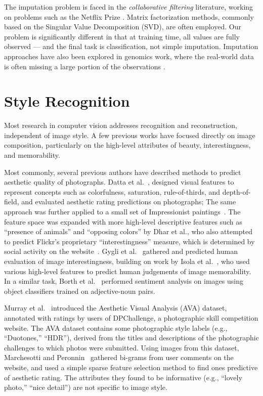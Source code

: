 The imputation problem is faced in the \emph{collaborative filtering} literature, working on problems such as the Netflix Prize \parencite{Koren-2009}.
Matrix factorization methods, commonly based on the Singular Value Decomposition (SVD), are often employed.
Our problem is significantly different in that at training time, all values are fully observed --- and the final task is classification, not simple imputation.
Imputation approaches have also been explored in genomics work, where the real-world data is often missing a large portion of the observations \parencite{Hastie-1999}.

\section{Style Recognition}

Most research in computer vision addresses recognition and reconstruction, independent of image style.
A few previous works have focused directly on image composition, particularly on the high-level attributes of beauty, interestingness, and memorability.

Most commonly, several previous authors have described methods to predict aesthetic quality of photographs.
Datta et al.~\parencite{Datta-ECCV-2006}, designed visual features to represent concepts such as colorfulness, saturation, rule-of-thirds, and depth-of-field, and evaluated aesthetic rating predictions on photographs; The same approach was further applied to a small set of Impressionist paintings~\parencite{Li-SP-2009}.
The feature space was expanded with more high-level descriptive features such as ``presence of animals'' and ``opposing colors'' by Dhar et al., who also attempted to predict Flickr's proprietary ``interestingness'' measure, which is determined by social activity on the website~\parencite{Dhar-CVPR-2011}.
Gygli et al.~\parencite{Gygli-ICCV-2013} gathered and predicted human evaluation of image interestingness, building on work by Isola et al.~\parencite{Isola-CVPR-2011}, who used various high-level features to predict human judgements of image memorability.
In a similar task, Borth et al.~\parencite{Borth-MM-2013} performed sentiment analysis on images using object classifiers trained on adjective-noun pairs.

Murray et al.~\parencite{Murray-CVPR-2012} introduced the Aesthetic Visual Analysis (AVA) dataset, annotated with ratings by users of DPChallenge, a photographic skill competition website.
The AVA dataset contains some photographic style labels (e.g., ``Duotones,'' ``HDR''), derived from the titles and descriptions of the photographic challenges to which photos were submitted.
Using images from this dataset, Marchesotti and Peronnin~\parencite{Marchesotti-BMVC-2013} gathered bi-grams from user comments on the website, and used a simple sparse feature selection method to find ones predictive of aesthetic rating.
The attributes they found to be informative (e.g., ``lovely photo,'' ``nice detail'') are not specific to image style.

